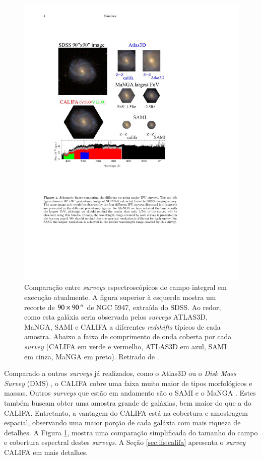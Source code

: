 \begin{figure}
	\includegraphics{figuras/surveysIFS}
	\caption[Comparação entre {\em surveys} espectroscópicos de campo integral]
	{Comparação entre {\em surveys} espectroscópicos de campo integral em execução
	atualmente. A figura superior à esquerda mostra um recorte de $90 \times
	90\,^{\prime\prime}$ de NGC 5947, extraída do SDSS. Ao redor, como esta galáxia seria
	observada pelos {\em surveys} ATLAS3D, MaNGA, SAMI e CALIFA a diferentes {\em
	redshifts} típicos de cada amostra. Abaixo a faixa de comprimento de onda
	coberta por cada {\em survey} (CALIFA em verde e vermelho, ATLAS3D em azul,
	SAMI em cinza, MaNGA em preto). Retirado de \citet{Sanchez2014}.}
	\label{fig:surveysIFS}
\end{figure}

Comparado a outros {\em surveys} já realizados, como o Atlas3D
\citep{Cappellari2011} ou o {\em Disk Mass Survey} (DMS) \citep{Bershady2010}, o
CALIFA cobre uma faixa muito maior de tipos morfológicos e massas. Outros {\em
surveys} que estão em andamento são o SAMI \citep{Croom2012, Bryant2015} e o
MaNGA \citep{Bundy2015}. Estes também buscam obter uma amostra grande de
galáxias, bem maior do que a do CALIFA. Entretanto, a vantagem do CALIFA está na
cobertura e amostragem espacial, observando uma maior porção de cada galáxia com
mais riqueza de detalhes. A Figura \ref{fig:surveysIFS}, mostra uma comparação
simplificada do tamanho do campo e cobertura espectral destes {\em surveys}. A
Seção \ref{sec:ifs:califa} apresenta o {\em survey} CALIFA em mais detalhes.

